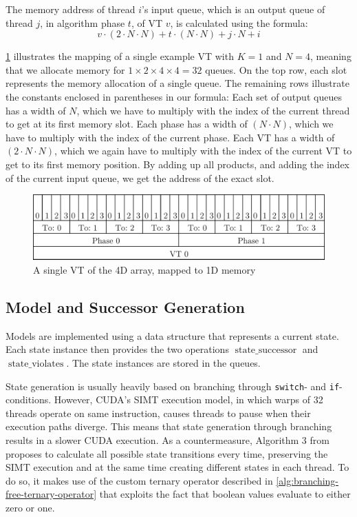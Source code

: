 \documentclass[
fancyheadings, %
%
%
]{stsreprt}
\DeclareMathOperator{\sSuccessor}{state\_successor}
\DeclareMathOperator{\sViolates}{state\_violates}
\begin{document}
The memory address of thread $i$'s input queue, which is an output queue of thread $j$, in algorithm phase $t$, of VT $v$, is calculated using the formula:
\[v \cdot (2 \cdot N \cdot N) + t \cdot (N \cdot N) + j \cdot N + i\]

\cref{fig:4d-mapped-memory} illustrates the mapping of a single example VT with $K=1$ and $N=4$, meaning that we allocate memory for $1 \times 2 \times 4 \times 4 = 32$ queues.
On the top row, each slot represents the memory allocation of a single queue.
The remaining rows illustrate the constants enclosed in parentheses in our formula:
Each set of output queues has a width of $N$, which we have to multiply with the index of the current thread to get at its first memory slot.
Each phase has a width of $(N \cdot N)$, which we have to multiply with the index of the current phase.
Each VT has a width of $(2 \cdot N \cdot N)$, which we again have to multiply with the index of the current VT to get to its first memory position.
By adding up all products, and adding the index of the current input queue, we get the address of the exact slot.

\begin{figure}[h]
    \includegraphics[width=\textwidth]{figures/4d-mapped-memory}
    \caption{A single VT of the 4D array, mapped to 1D memory}
    \label{fig:4d-mapped-memory}
\end{figure}

\subsection{Model and Successor Generation}

Models are implemented using a data structure that represents a current state.
Each state instance then provides the two operations $\sSuccessor$ and $\sViolates$.
The state instances are stored in the queues.

State generation is usually heavily based on branching through \texttt{switch}- and \texttt{if}-conditions.
However, CUDA's SIMT execution model, in which warps of 32 threads operate on same instruction, causes threads to pause when their execution paths diverge.
This means that state generation through branching results in a slower CUDA execution.
As a countermeasure, Algorithm 3 from \cite{Bartocci2014.GPGPU-Parallel-SPIN} proposes to calculate all possible state transitions every time, preserving the SIMT execution and at the same time creating different states in each thread.
To do so, it makes use of the custom ternary operator described in \cref{alg:branching-free-ternary-operator} that exploits the fact that boolean values evaluate to either zero or one.
\end{document}
